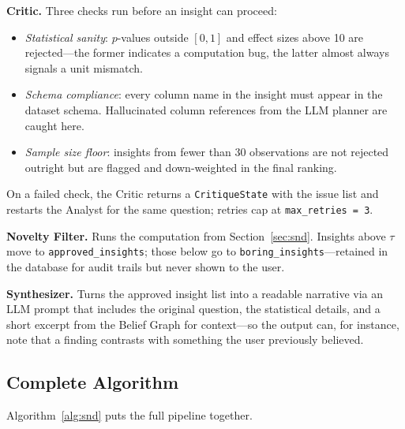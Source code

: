 \documentclass[conference]{IEEEtran}
\begin{document}
\textbf{Critic.} Three checks run before an insight can proceed:
\begin{itemize}
  \item \textit{Statistical sanity}: $p$-values outside $[0,1]$ and
        effect sizes above 10 are rejected---the former indicates a
        computation bug, the latter almost always signals a unit mismatch.
  \item \textit{Schema compliance}: every column name in the insight
        must appear in the dataset schema. Hallucinated column references
        from the LLM planner are caught here.
  \item \textit{Sample size floor}: insights from fewer than 30
        observations are not rejected outright but are flagged and
        down-weighted in the final ranking.
\end{itemize}
On a failed check, the Critic returns a \texttt{CritiqueState} with
the issue list and restarts the Analyst for the same question;
retries cap at \texttt{max\_retries = 3}.

\textbf{Novelty Filter.} Runs the computation from
Section~\ref{sec:snd}. Insights above $\tau$ move to
\texttt{approved\_insights}; those below go to
\texttt{boring\_insights}---retained in the database for audit
trails but never shown to the user.

\textbf{Synthesizer.} Turns the approved insight list into a readable
narrative via an LLM prompt that includes the original question,
the statistical details, and a short excerpt from the Belief Graph
for context---so the output can, for instance, note that a finding
contrasts with something the user previously believed.

\subsection{Complete Algorithm}

Algorithm~\ref{alg:snd} puts the full pipeline together.
\end{document}
